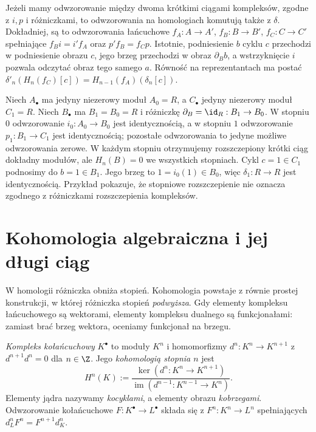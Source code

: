 \begin{uwaga}
\label{uwaga:les-naturalnosc}
Jeżeli mamy odwzorowanie między dwoma krótkimi
ciągami kompleksów, zgodne z $i,p$ i
różniczkami, to odwzorowania na homologiach
komutują także z $\delta$.
Dokładniej, są to odwzorowania łańcuchowe
$f_A:A\to A'$, $f_B:B\to B'$, $f_C:C\to C'$ spełniające
$f_Bi=i'f_A$ oraz $p'f_B=f_Cp$.
Istotnie, podniesienie $b$ cyklu $c$ przechodzi
w podniesienie obrazu $c$, jego brzeg przechodzi
w obraz $\partial_Bb$, a wstrzyknięcie $i$
pozwala odczytać obraz tego samego $a$.
Równość na reprezentantach ma postać
$\delta'_n(H_n(f_C)[c])
=H_{n-1}(f_A)(\delta_n[c])$.
\end{uwaga}

\begin{przyklad}
\label{prz:delta-izomorfizm}
Niech $A_\bullet$ ma jedyny niezerowy moduł
$A_0=R$, a $C_\bullet$ jedyny niezerowy
moduł $C_1=R$. Niech $B_\bullet$ ma
$B_1=B_0=R$ i różniczkę
$\partial_B=\id_R:B_1\to B_0$.
W stopniu $0$ odwzorowanie $i_0:A_0\to B_0$
jest identycznością, a w stopniu $1$
odwzorowanie $p_1:B_1\to C_1$ jest identycznością;
pozostałe odwzorowania to jedyne możliwe odwzorowania zerowe.
W każdym stopniu otrzymujemy rozszczepiony
krótki ciąg dokładny modułów, ale
$H_n(B)=0$ we wszystkich stopniach.
Cykl $c=1\in C_1$ podnosimy do $b=1\in B_1$.
Jego brzeg to $1=i_0(1)\in B_0$,
więc $\delta_1:R\to R$ jest identycznością.
Przykład pokazuje, że stopniowe rozszczepienie
nie oznacza zgodnego z różniczkami
rozszczepienia kompleksów.
\end{przyklad}
\section{Kohomologia algebraiczna i jej długi ciąg}
\label{sec:kohomologia-algebraiczna}

W homologii różniczka obniża stopień.
Kohomologia powstaje z równie prostej
konstrukcji, w której różniczka stopień
\emph{podwyższa}. Gdy elementy kompleksu
łańcuchowego są wektorami, elementy
kompleksu dualnego są funkcjonałami:
zamiast brać brzeg wektora, oceniamy
funkcjonał na brzegu.

\begin{definicja}
\label{def:kohomologia-algebraiczna}
\emph{Kompleks kołańcuchowy} $K^\bullet$ to
moduły $K^n$ i homomorfizmy
$d^n:K^n\to K^{n+1}$ z
$d^{n+1}d^n=0$ dla $n\in\Z$. Jego \emph{kohomologią stopnia $n$}
jest
\begin{equation}\label{eq:kohomologia-def}
 H^n(K):=\frac{\ker(d^n:K^n\to K^{n+1})}
 {\operatorname{im}(d^{n-1}:K^{n-1}\to K^n)}.
\end{equation}
Elementy jądra nazywamy \emph{kocyklami},
a elementy obrazu \emph{kobrzegami}.
Odwzorowanie kołańcuchowe $F:K^\bullet\to L^\bullet$
składa się z $F^n:K^n\to L^n$ spełniających
$d_L^nF^n=F^{n+1}d_K^n$.
\end{definicja}

